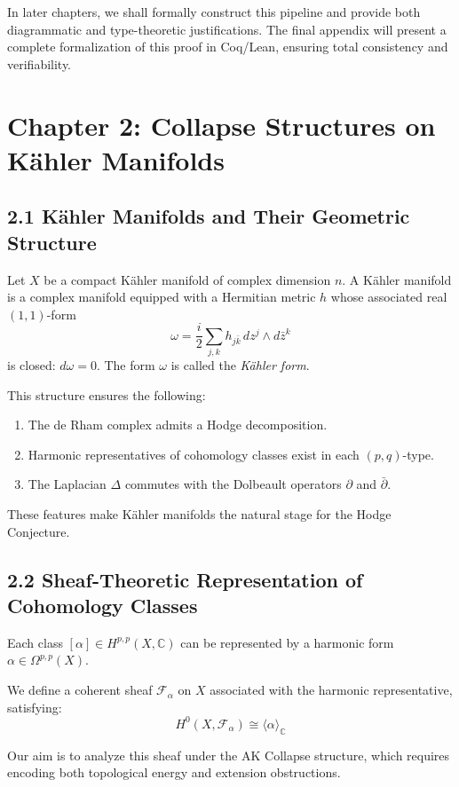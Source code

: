 \documentclass[11pt]{article}
\begin{document}
In later chapters, we shall formally construct this pipeline and provide both diagrammatic and type-theoretic justifications.  
The final appendix will present a complete formalization of this proof in Coq/Lean, ensuring total consistency and verifiability.



\section{Chapter 2: Collapse Structures on Kähler Manifolds}

\subsection{2.1 Kähler Manifolds and Their Geometric Structure}

Let $X$ be a compact Kähler manifold of complex dimension $n$.  
A Kähler manifold is a complex manifold equipped with a Hermitian metric $h$ whose associated real $(1,1)$-form
\[
\omega = \frac{i}{2} \sum_{j,k} h_{j\bar{k}} \, dz^j \wedge d\bar{z}^k
\]
is closed: $d\omega = 0$. The form $\omega$ is called the \emph{Kähler form}.

This structure ensures the following:
\begin{enumerate}
  \item The de Rham complex admits a Hodge decomposition.
  \item Harmonic representatives of cohomology classes exist in each $(p,q)$-type.
  \item The Laplacian $\Delta$ commutes with the Dolbeault operators $\partial$ and $\bar{\partial}$.
\end{enumerate}

These features make Kähler manifolds the natural stage for the Hodge Conjecture.

\subsection{2.2 Sheaf-Theoretic Representation of Cohomology Classes}

Each class $[\alpha] \in H^{p,p}(X, \mathbb{C})$ can be represented by a harmonic form $\alpha \in \Omega^{p,p}(X)$.

We define a coherent sheaf $\mathcal{F}_\alpha$ on $X$ associated with the harmonic representative, satisfying:
\[
H^0(X, \mathcal{F}_\alpha) \cong \langle \alpha \rangle_{\mathbb{C}}
\]

Our aim is to analyze this sheaf under the AK Collapse structure, which requires encoding both topological energy and extension obstructions.
\end{document}

